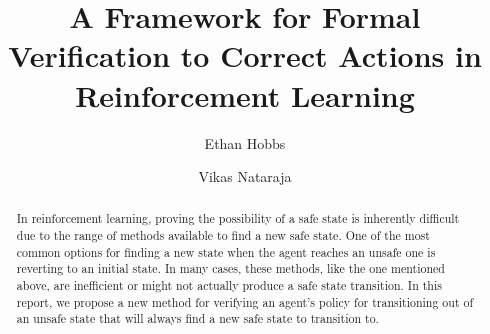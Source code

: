 \documentclass[11pt]{article}
\begin{document}
\title{A Framework for Formal Verification to Correct Actions in Reinforcement Learning}
 
\author{
{Ethan Hobbs} \and {Vikas Nataraja}
}

\maketitle

\setcounter{page}{1}
\begin{abstract}

\noindent In reinforcement learning, proving the possibility of a safe state is inherently difficult due to the range of methods available to find a new safe state. One of the most common options for finding a new state when the agent reaches an unsafe one is reverting to an initial state. In many cases, these methods, like the one mentioned above, are inefficient or might not actually produce a safe state transition. In this report, we propose a new method for verifying an agent's policy for transitioning out of an unsafe state that will always find a new safe state to transition to.
\end{abstract}
\end{document}

